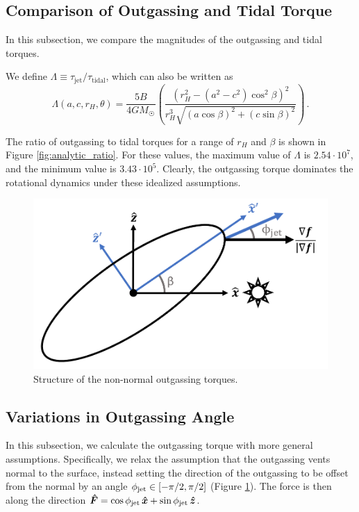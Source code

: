 \documentclass[twocolumn,doublespacing]{aastex631}
\begin{document}
\subsection{Comparison of Outgassing and Tidal Torque}\label{sec:torquecomp}

In this subsection, we compare the magnitudes of the outgassing and tidal torques. 

We define $\Lambda\equiv\tau_{\mathrm{jet}}/\tau_{\mathrm{tidal}}$, which can also be written as
\begin{equation}
    \Lambda(a,c,r_H,\theta)=\frac{5B}{4GM_\Sun}\left(\frac{(r_H^2-(a^2-c^2)\cos^2{\beta})^2}{r_H^3\sqrt{(a\cos\beta)^2+(c\sin\beta)^2}}\right)\,.
\end{equation}

The ratio of outgassing to tidal torques for a range of $r_H$ and $\beta$ is shown in Figure \ref{fig:analytic_ratio}. For these values, the maximum value of $\Lambda$ is $2.54\cdot10^7$, and the minimum value is $3.43\cdot10^5$. Clearly, the outgassing torque dominates the rotational dynamics under these idealized assumptions.

\begin{figure}
\centering
\includegraphics[width=\linewidth,angle=0]{outgassing_diagram.pdf}
\caption{Structure of the non-normal outgassing torques.}
\label{fig:outgas_rot}
\end{figure}

\subsection{Variations in Outgassing Angle}\label{sec:angleana}

In this subsection, we calculate the outgassing torque with more general assumptions. Specifically, we relax the assumption that the outgassing vents normal to the surface, instead setting the direction of the outgassing to be offset from the normal by an angle $\phi_{\rm jet}\in[-\pi/2,\pi/2]$ (Figure \ref{fig:outgas_rot}). The force is then along the direction $\boldsymbol{\hat{F}}=\cos{\phi_{\rm jet}}\,\boldsymbol{\hat{x}}+\sin{\phi_{\rm jet}}\,\boldsymbol{\hat{z}}$. 
\end{document}
